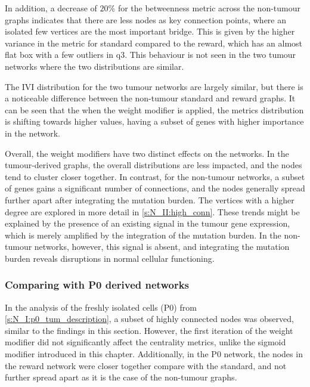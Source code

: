 In addition, a decrease of $20\%$ for the betweenness metric across the non-tumour graphs indicates that there are less nodes as key connection points, where an isolated few vertices are the most important bridge. This is given by the higher variance in the metric for standard compared to the reward, which has an almost flat box with a few outliers in q3. This behaviour is not seen in the two tumour networks where the two distributions are similar.


The IVI distribution for the two tumour networks are largely similar, but there is a noticeable difference between the non-tumour standard and reward graphs. It can be seen that the when the weight modifier is applied, the metrics distribution is shifting towards higher values, having a subset of genes with higher importance in the network.

Overall, the weight modifiers have two distinct effects on the networks. In the tumour-derived graphs, the overall distributions are less impacted, and the nodes tend to cluster closer together. In contrast, for the non-tumour networks, a subset of genes gains a significant number of connections, and the nodes generally spread further apart after integrating the mutation burden. The vertices with a higher degree are explored in more detail in \cref{s:N_II:high_conn}. These trends might be explained by the presence of an existing signal in the tumour gene expression, which is merely amplified by the integration of the mutation burden. In the non-tumour networks, however, this signal is absent, and integrating the mutation burden reveals disruptions in normal cellular functioning.

\subsubsection*{Comparing with P0 derived networks}

In the analysis of the freshly isolated cells (P0) from \cref{s:N_I:p0_tum_description}, a subset of highly connected nodes was observed, similar to the findings in this section. However, the first iteration of the weight modifier did not significantly affect the centrality metrics, unlike the sigmoid modifier introduced in this chapter. Additionally, in the P0 network, the nodes in the reward network were closer together compare with the standard, and not further spread apart as it is the case of the non-tumour graphs.

